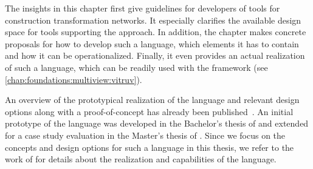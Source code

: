 
The insights in this chapter first give guidelines for developers of tools for construction transformation networks.
It especially clarifies the available design space for tools supporting the \commonalities approach.
In addition, the chapter makes concrete proposals for how to develop such a language, which elements it has to contain and how it can be operationalized.
Finally, it even provides an actual realization of such a language, which can be readily used with the \vitruv framework (see \autoref{chap:foundations:multiview:vitruv}).

An overview of the prototypical realization of the \commonalities language and relevant design options along with a proof-of-concept has already been published~.
An initial prototype of the language was developed in the Bachelor's thesis of  and extended for a case study evaluation in the Master's thesis of .
Since we focus on the concepts and design options for such a language in this thesis, we refer to the work of  for details about the realization and capabilities of the \commonalities language.







